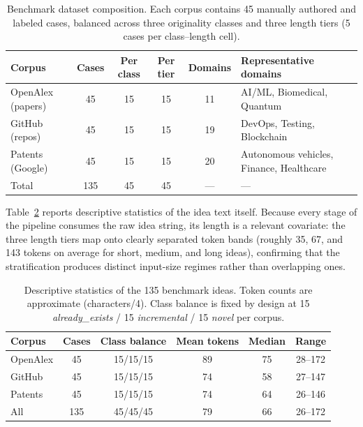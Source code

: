 \begin{table}[width=\textwidth,cols=6,pos=ht]
    \caption{Benchmark dataset composition. Each corpus contains 45 manually authored and labeled cases, balanced across three originality classes and three length tiers (5 cases per class--length cell).}
    \label{tab:dataset}
    \begin{tabular*}{\textwidth}{@{\extracolsep{\fill}}lccccl@{}}
        \toprule
        Corpus & Cases & Per class & Per tier & Domains & Representative domains \\
        \midrule
        OpenAlex (papers)  & 45 & 15 & 15 & 11 & AI/ML, Biomedical, Quantum \\
        GitHub (repos)     & 45 & 15 & 15 & 19 & DevOps, Testing, Blockchain \\
        Patents (Google)   & 45 & 15 & 15 & 20 & Autonomous vehicles, Finance, Healthcare \\
        \midrule
        Total & 135 & 45 & 45 & --- & --- \\
        \bottomrule
    \end{tabular*}
\end{table}

Table~\ref{tab:datastats} reports descriptive statistics of the idea text itself. Because every stage of the pipeline consumes the raw idea string, its length is a relevant covariate: the three length tiers map onto clearly separated token bands (roughly 35, 67, and 143 tokens on average for short, medium, and long ideas), confirming that the stratification produces distinct input-size regimes rather than overlapping ones.

\begin{table}[width=\textwidth,cols=6,pos=ht]
    \caption{Descriptive statistics of the 135 benchmark ideas. Token counts are approximate (characters/4). Class balance is fixed by design at 15 \textit{already\_exists} / 15 \textit{incremental} / 15 \textit{novel} per corpus.}
    \label{tab:datastats}
    \begin{tabular*}{\textwidth}{@{\extracolsep{\fill}}lccccc@{}}
        \toprule
        Corpus & Cases & Class balance & Mean tokens & Median & Range \\
        \midrule
        OpenAlex & 45  & 15/15/15 & 89 & 75 & 28--172 \\
        GitHub   & 45  & 15/15/15 & 74 & 58 & 27--147 \\
        Patents  & 45  & 15/15/15 & 74 & 64 & 26--146 \\
        \midrule
        All      & 135 & 45/45/45 & 79 & 66 & 26--172 \\
        \bottomrule
    \end{tabular*}
\end{table}

